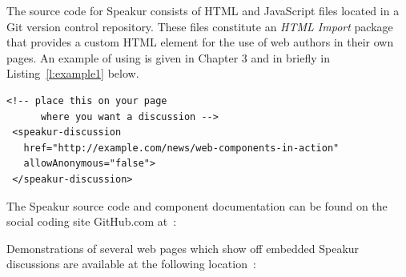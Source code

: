 The source code for Speakur consists of HTML and JavaScript files located in a Git version control repository. 
These files constitute an \textit{HTML Import} package that provides a
\textbf{}
custom HTML element for the use of web authors in their own pages.
An example of using  is given in Chapter 3 and in briefly in Listing~\ref{l:example1} below.

\begin{lstlisting}[language=HTML5,caption={Speakur custom HTML element},label=l:example1]
 <!-- place this on your page
      where you want a discussion -->
 <speakur-discussion
   href="http://example.com/news/web-components-in-action"
   allowAnonymous="false">
 </speakur-discussion>
\end{lstlisting}

The Speakur source code and component documentation can be found on the social coding site GitHub.com at~\cite{landers2015-b}:


Demonstrations of several web pages which show off embedded Speakur discussions are available at the following location~\cite{landers2015-c}:

